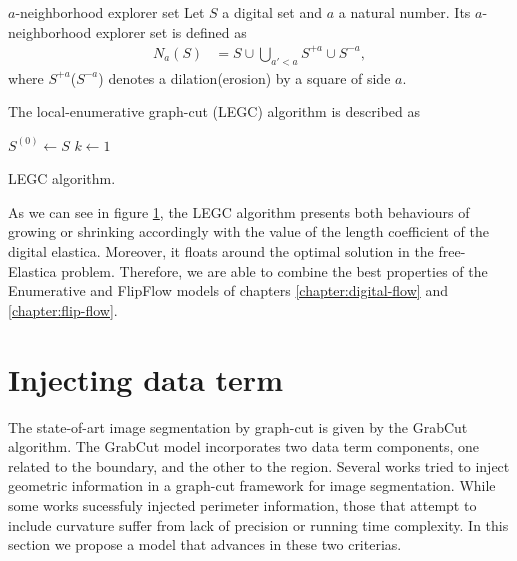 \begin{definition}{$a$-neighborhood explorer set}
	Let $S$ a digital set and $a$ a natural number. Its $a$-neighborhood explorer set is defined as
	\begin{align*}
		N_a(S) &= S \cup \bigcup_{a' < a}{S^{+a} \cup S^{-a}},
	\end{align*}
	where $S^{+a}$($S^{-a}$) denotes a dilation(erosion) by a square of side $a$.
\end{definition}

The local-enumerative graph-cut (LEGC) algorithm is described as


\begin{algorithm}
 
 \BlankLine
 $S^{(0)} \longleftarrow S$\;
 $k \longleftarrow 1$\;
 \caption{LEGC algorithm.}
 \label{alg:legc-algorithm}  
\end{algorithm}

As we can see in figure \ref{}, the LEGC algorithm presents both behaviours of growing or shrinking accordingly with the value of the length coefficient of the digital elastica. Moreover, it floats around the optimal solution in the free-Elastica problem. Therefore, we are able to combine the best properties of the Enumerative and FlipFlow models of chapters \ref{chapter:digital-flow} and \ref{chapter:flip-flow}.

\section{Injecting data term}

The state-of-art image segmentation by graph-cut is given by the GrabCut algorithm. The GrabCut model incorporates two data term components, one related to the boundary, and the other to the region. Several works tried to inject geometric information in a graph-cut framework for image segmentation. While some works sucessfuly injected perimeter information, those that attempt to include curvature suffer from lack of precision or running time complexity. In this section we propose a model that advances in these two criterias.
